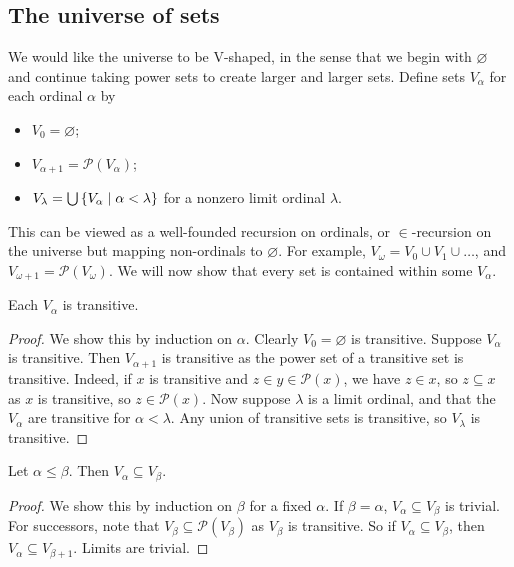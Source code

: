 \subsection{The universe of sets}
We would like the universe to be V-shaped, in the sense that we begin with \( \varnothing \) and continue taking power sets to create larger and larger sets.
Define sets \( V_\alpha \) for each ordinal \( \alpha \) by
\begin{itemize}
    \item \( V_0 = \varnothing \);
    \item \( V_{\alpha+1} = \mathcal P(V_\alpha) \);
    \item \( V_\lambda = \bigcup \qty{V_\alpha \mid \alpha < \lambda} \) for a nonzero limit ordinal \( \lambda \).
\end{itemize}
This can be viewed as a well-founded recursion on ordinals, or \( \in \)-recursion on the universe but mapping non-ordinals to \( \varnothing \).
For example, \( V_\omega = V_0 \cup V_1 \cup \dots \), and \( V_{\omega+1} = \mathcal P(V_\omega) \).
We will now show that every set is contained within some \( V_\alpha \).
\begin{lemma}
    Each \( V_\alpha \) is transitive.
\end{lemma}
\begin{proof}
    We show this by induction on \( \alpha \).
    Clearly \( V_0 = \varnothing \) is transitive.
    Suppose \( V_\alpha \) is transitive.
    Then \( V_{\alpha+1} \) is transitive as the power set of a transitive set is transitive.
    Indeed, if \( x \) is transitive and \( z \in y \in \mathcal P(x) \), we have \( z \in x \), so \( z \subseteq x \) as \( x \) is transitive, so \( z \in \mathcal P(x) \).
    Now suppose \( \lambda \) is a limit ordinal, and that the \( V_\alpha \) are transitive for \( \alpha < \lambda \).
    Any union of transitive sets is transitive, so \( V_\lambda \) is transitive.
\end{proof}
\begin{lemma}
    Let \( \alpha \leq \beta \).
    Then \( V_\alpha \subseteq V_\beta \).
\end{lemma}
\begin{proof}
    We show this by induction on \( \beta \) for a fixed \( \alpha \).
    If \( \beta = \alpha \), \( V_\alpha \subseteq V_\beta \) is trivial.
    For successors, note that \( V_\beta \subseteq \mathcal P(V_\beta) \) as \( V_\beta \) is transitive.
    So if \( V_\alpha \subseteq V_\beta \), then \( V_\alpha \subseteq V_{\beta+1} \).
    Limits are trivial.
\end{proof}
